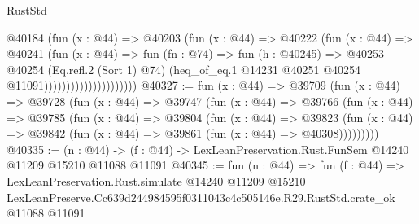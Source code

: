 \begin{lexlean}{RustStd}
\begin{coremodule}
                                  @40184
                                    (fun (x : @44) =>
                                    @40203
                                      (fun (x : @44) =>
                                      @40222
                                        (fun (x : @44) =>
                                        @40241
                                          (fun (x : @44) =>
                                          fun (fn : @74) =>
                                          fun (h : @40245) =>
                                          @40253
                                            @40254
                                            (Eq.refl.{2} (Sort 1) @74)
                                            (heq_of_eq.{1}
                                              @14231
                                              @40251
                                              @40254
                                              @11091)))))))))))))))))))))
@40327 := fun (x : @44) =>
  @39709
    (fun (x : @44) =>
    @39728
      (fun (x : @44) =>
      @39747
        (fun (x : @44) =>
        @39766
          (fun (x : @44) =>
          @39785
            (fun (x : @44) =>
            @39804
              (fun (x : @44) =>
              @39823
                (fun (x : @44) => @39842 (fun (x : @44) => @39861 (fun (x : @44) => @40308)))))))))
@40335 := (n : @44) ->
  (f : @44) -> LexLeanPreservation.Rust.FunSem @14240 @11209 @15210 @11088 @11091
@40345 := fun (n : @44) =>
  fun (f : @44) =>
  LexLeanPreservation.Rust.simulate
    @14240
    @11209
    @15210
    LexLeanPreserve.Cc639d244984595f0311043c4c505146e.R29.RustStd.crate_ok
    @11088
    @11091
\end{coremodule}
\end{lexlean}
